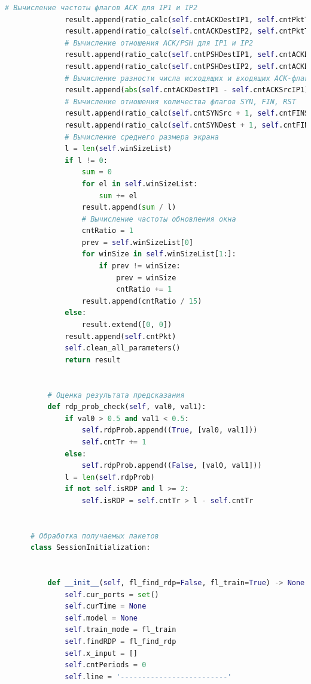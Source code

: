 \documentclass[bachelor, och, coursework]{SCWorks}
\begin{document}
\begin{lstlisting}[language=Python]
              # Вычисление частоты флагов ACK для IP1 и IP2
              result.append(ratio_calc(self.cntACKDestIP1, self.cntPktTCPDestIP1))
              result.append(ratio_calc(self.cntACKDestIP2, self.cntPktTCPDestIP2))
              # Вычисление отношения ACK/PSH для IP1 и IP2
              result.append(ratio_calc(self.cntPSHDestIP1, self.cntACKDestIP1))
              result.append(ratio_calc(self.cntPSHDestIP2, self.cntACKDestIP2))
              # Вычисление разности числа исходящих и входящих ACK-флагов IP1
              result.append(abs(self.cntACKDestIP1 - self.cntACKSrcIP1))
              # Вычисление отношения количества флагов SYN, FIN, RST
              result.append(ratio_calc(self.cntSYNSrc + 1, self.cntFINSrc + self.cntRSTSrc + 1))
              result.append(ratio_calc(self.cntSYNDest + 1, self.cntFINDest + self.cntRSTDest + 1))
              # Вычисление среднего размера экрана
              l = len(self.winSizeList)
              if l != 0:
                  sum = 0
                  for el in self.winSizeList:
                      sum += el
                  result.append(sum / l)
                  # Вычисление частоты обновления окна
                  cntRatio = 1
                  prev = self.winSizeList[0]
                  for winSize in self.winSizeList[1:]:
                      if prev != winSize:
                          prev = winSize
                          cntRatio += 1
                  result.append(cntRatio / 15)
              else:
                  result.extend([0, 0])
              result.append(self.cntPkt)
              self.clean_all_parameters()
              return result
      
      
          # Оценка результата предсказания
          def rdp_prob_check(self, val0, val1):
              if val0 > 0.5 and val1 < 0.5:
                  self.rdpProb.append((True, [val0, val1]))
                  self.cntTr += 1
              else:
                  self.rdpProb.append((False, [val0, val1]))
              l = len(self.rdpProb)
              if not self.isRDP and l >= 2:
                  self.isRDP = self.cntTr > l - self.cntTr
      
      
      # Обработка получаемых пакетов
      class SessionInitialization:
      
      
          def __init__(self, fl_find_rdp=False, fl_train=True) -> None:
              self.cur_ports = set()
              self.curTime = None
              self.model = None
              self.train_mode = fl_train
              self.findRDP = fl_find_rdp
              self.x_input = []
              self.cntPeriods = 0
              self.line = '-------------------------'
      

\end{lstlisting}
\end{document}
